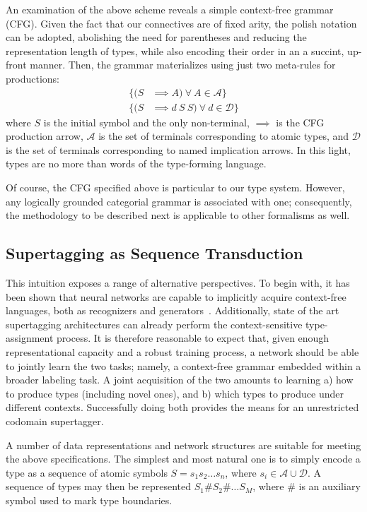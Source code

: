 An examination of the above scheme reveals a simple context-free grammar (CFG).
Given the fact that our connectives are of fixed arity, the polish notation~\cite{hamblin1962translation} can be adopted, abolishing the need for parentheses and reducing the representation length of types, while also encoding their order in an a succint, up-front manner.
Then, the grammar materializes using just two meta-rules for productions:
\begin{align}
\{ (S & \implies A) \  \forall \ A \in \mathcal{A} \}
\\
\{(S & \implies d \ S \ S) \ \forall \ d \in \mathcal{D} \}
\label{eqn:cfg}
\end{align}
where $S$ is the initial symbol and the only non-terminal, $\implies$ is the CFG production arrow, $\mathcal{A}$ is the set of terminals corresponding to atomic types, and $\mathcal{D}$ is the set of terminals corresponding to named implication arrows.
In this light, types are no more than words of the type-forming language.

Of course, the CFG specified above is particular to our type system.
However, any logically grounded categorial grammar is associated with one; consequently, the methodology to be described next is applicable to other formalisms as well. 

\subsection{Supertagging as Sequence Transduction}
This intuition exposes a range of alternative perspectives.
To begin with, it has been shown that neural networks are capable to implicitly acquire context-free languages, both as recognizers and generators~\cite{noPhysics}.
Additionally, state of the art supertagging architectures can already perform the context-sensitive type-assignment process.
It is therefore reasonable to expect that, given enough representational capacity and a robust training process, a network should be able to jointly learn the two tasks; namely, a context-free grammar embedded within a broader labeling task.
A joint acquisition of the two amounts to learning a) how to produce types (including novel ones), and b) which types to produce under different contexts.
Successfully doing both provides the means for an unrestricted codomain supertagger.

A number of data representations and network structures are suitable for meeting the above specifications.
The simplest and most natural one is to simply encode a type as a sequence of atomic symbols $S = s_1 s_2\dots s_n$, where $s_i \in \mathcal{A}\cup\mathcal{D}$.
A sequence of types may then be represented $S_1 \# S_2 \# \dots S_M$, where \# is an auxiliary symbol used to mark type boundaries.

